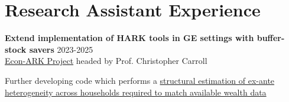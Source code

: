 
\section{Research Assistant Experience} %
\label{sec:research_exper}
\vspace{-0.25in}
\begin{outerlist}

\item {\bf Extend implementation of HARK tools in GE settings with buffer-stock savers} \hfill 2023-2025\\
	\href{https://econ-ark.org}{Econ-ARK Project} headed by Prof. Christopher Carroll
	\begin{innerlist}
		\item Further developing code which performs a \href{https://github.com/econ-ark/DistributionOfWealthMPC}{structural estimation of ex-ante heterogeneity across households required to match available wealth data}
		
	\end{innerlist}
	
\end{outerlist}